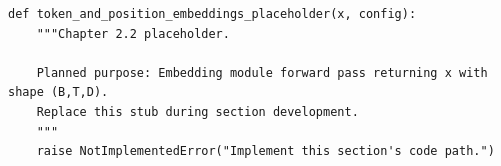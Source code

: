 \begin{lstlisting}[style=bookpython,caption={Planned code placeholder for token and position embeddings.},label={lst:ch02-token-and-position-embeddings}]
def token_and_position_embeddings_placeholder(x, config):
    """Chapter 2.2 placeholder.

    Planned purpose: Embedding module forward pass returning x with shape (B,T,D).
    Replace this stub during section development.
    """
    raise NotImplementedError("Implement this section's code path.")
\end{lstlisting}

